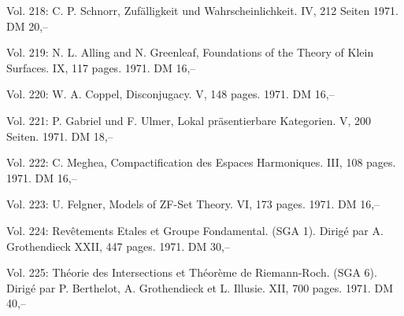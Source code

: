 Vol. 218: C. P. Schnorr, Zufälligkeit und Wahrscheinlichkeit. IV, 212 Seiten 1971. DM 20,--

Vol. 219: N. L. Alling and N. Greenleaf, Foundations of the Theory of Klein Surfaces. IX, 117 pages. 1971. DM 16,--

Vol. 220: W. A. Coppel, Disconjugacy. V, 148 pages. 1971. DM 16,--

Vol. 221: P. Gabriel und F. Ulmer, Lokal präsentierbare Kategorien. V, 200 Seiten. 1971. DM 18,--

Vol. 222: C. Meghea, Compactification des Espaces Harmoniques. III, 108 pages. 1971. DM 16,--

Vol. 223: U. Felgner, Models of ZF-Set Theory. VI, 173 pages. 1971. DM 16,--

Vol. 224: Revêtements Etales et Groupe Fondamental. (SGA 1). Dirigé par A. Grothendieck XXII, 447 pages. 1971. DM 30,--

Vol. 225: Théorie des Intersections et Théorème de Riemann-Roch. (SGA 6). Dirigé par P. Berthelot, A. Grothendieck et L. Illusie. XII, 700 pages. 1971. DM 40,--

